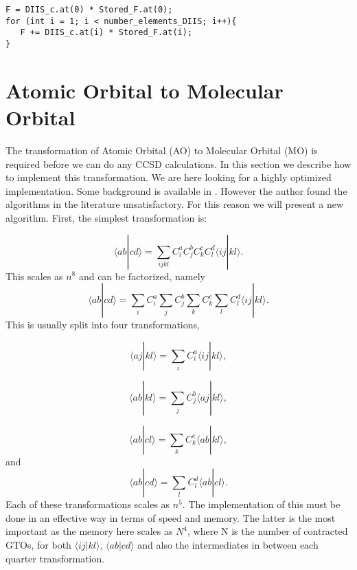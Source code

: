 \documentclass[a4paper,norsk,11pt,twoside]{report}
\begin{document}
\begin{lstlisting}
F = DIIS_c.at(0) * Stored_F.at(0);
for (int i = 1; i < number_elements_DIIS; i++){
   F += DIIS_c.at(i) * Stored_F.at(i);
}
\end{lstlisting}

\section{Atomic Orbital to Molecular Orbital}
The transformation of Atomic Orbital (AO) to Molecular Orbital (MO) is
required before we can do any CCSD calculations. In this section we
describe how to implement this transformation. We are here looking for
a highly optimized implementation. Some background is available in
\cite{aotomo_1_cite}. However the author found the algorithms in the
literature unsatisfactory. For this reason we will present a new
algorithm. First, the simplest transformation is:

\begin{equation}
\langle ab | cd \rangle = \sum_{ijkl} C_i^a C_j^b C_k^c C_l^d \langle ij|kl \rangle .
\end{equation}
This scales as $n^8$ and can be factorized, namely
\begin{equation}
\langle ab | cd \rangle = \sum_i C_i^a \sum_j C_j^b \sum_k C_k^c \sum_l C_l^d  \langle ij|kl \rangle .
\end{equation}
This is usually split into four transformations, 

\begin{equation}
\langle aj|kl \rangle = \sum_{i} C_i^a \langle ij|kl \rangle ,
\end{equation}

\begin{equation}
\langle ab|kl \rangle = \sum_{j} C_j^b \langle aj|kl \rangle,
\end{equation}

\begin{equation}
\langle ab|cl \rangle = \sum_{k} C_k^c \langle ab|kl \rangle ,
\end{equation}
and
\begin{equation}
\langle ab|cd \rangle = \sum_{l} C_l^d \langle ab|cl \rangle .
\end{equation}
Each of these transformations scales as $n^5$. The implementation of
this must be done in an effective way in terms of speed and
memory. The latter is the most important as the memory here scales as
$N^4$, where N is the number of contracted GTOs, for both $\langle ij
| kl\rangle$, $\langle ab | cd \rangle$ and also the intermediates in
between each quarter transformation. \\
\end{document}

